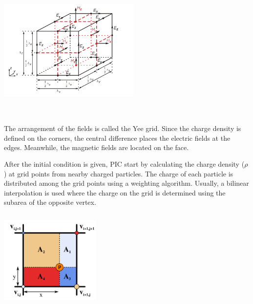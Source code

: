 \documentclass[12pt]{article}
\begin{document}
\newpage
\noindent
\begin{minipage}{0.6\textwidth}\raggedright
    \includegraphics[height=7cm, width=7cm]{yee.png}
\end{minipage}
\begin{minipage}{0.35\textwidth}\raggedright
    The arrangement of the fields is called the Yee grid.
    Since the charge density is defined on the corners, the central difference places the electric fields at the edges. Meanwhile, the magnetic fields are located on the face.
\end{minipage}

\noindent
\begin{minipage}{0.55\textwidth}\raggedleft
    After the initial condition is given, PIC start by calculating the charge density ($\rho$) at grid points from nearby charged
    particles. The charge of each particle is distributed among the grid points using a weighting algorithm. Usually, a bilinear interpolation is used where the charge on the grid is determined using the subarea of the opposite vertex.
\end{minipage}
\begin{minipage}{0.4\textwidth}\raggedleft
    \includegraphics[height=5cm, width=5cm]{charge.png}
\end{minipage}
\vspace*{0.5cm}
\end{document}
